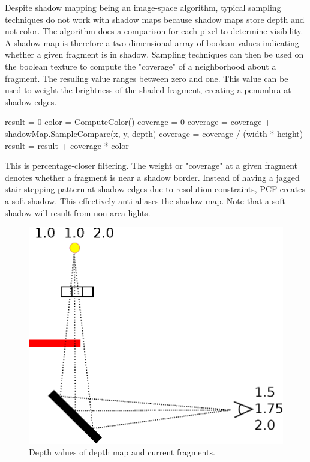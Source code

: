 \documentclass[12pt]{article}
\begin{document}
Despite shadow mapping being an image-space algorithm, typical sampling techniques do not work with shadow maps because shadow maps store depth and not color. The algorithm does a comparison for each pixel to determine visibility. A shadow map is therefore a two-dimensional array of boolean values indicating whether a given fragment is in shadow. Sampling techniques can then be used on the boolean texture to compute the "coverage" of a neighborhood about a fragment. The resuling value ranges between zero and one.
This value can be used to weight the brightness of the shaded fragment, creating a penumbra at shadow edges.

\begin{algorithm}
result = 0\;
{
	color = ComputeColor()\;
	coverage = 0\;
	{
		{
			coverage = coverage + shadowMap.SampleCompare(x, y, depth)\;
		}
	}
	coverage = coverage / (width * height)\;
	result = result + coverage * color\;
}
\end{algorithm}

This is percentage-closer filtering. The weight or "coverage" at a given fragment denotes whether a fragment is near a shadow border. Instead of having a jagged stair-stepping pattern at shadow edges due to resolution constraints, PCF creates a soft shadow.
This effectively anti-aliases the shadow map. Note that a soft shadow will result from non-area lights.

\begin{figure}
\centering
\includegraphics[scale=0.5]{depth2.eps}
\caption{\label{fig:depth} Depth values of depth map and current fragments.}
\end{figure}
\end{document}
